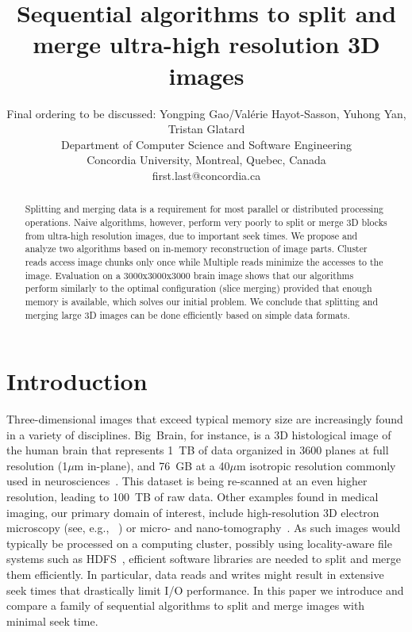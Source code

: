 \documentclass[10pt, conference, compsocconf]{IEEEtran}
\begin{document}
\title{Sequential algorithms to split and merge ultra-high resolution 3D images}

\author{Final ordering
  to be discussed: Yongping Gao/Val\'erie Hayot-Sasson,
  Yuhong Yan, Tristan Glatard\\
  Department of Computer Science and Software Engineering\\ Concordia University, Montreal, Quebec, Canada\\
  {first.last}@concordia.ca
}

\maketitle

\begin{abstract}
  Splitting and merging data is a requirement for most parallel or
  distributed processing operations. Naive algorithms, however,
  perform very poorly to split or merge 3D blocks from ultra-high
  resolution images, due to important seek times. We propose and
  analyze two algorithms based on in-memory reconstruction of image
  parts. Cluster reads access image chunks only once while Multiple
  reads minimize the accesses to the image. Evaluation on a
  3000x3000x3000 brain image shows that our algorithms perform
  similarly to the optimal configuration (slice merging) provided that
  enough memory is available, which solves our initial problem.  We
  conclude that splitting and merging large 3D images can be done
  efficiently based on simple data formats.
\end{abstract}


\section{Introduction}

Three-dimensional images that exceed typical memory size are
increasingly found in a variety of disciplines. Big~Brain, for
instance, is a 3D histological image of the human brain that
represents 1~TB of data organized in 3600 planes at full resolution
(1$\mu$m in-plane), and 76~GB at a 40$\mu$m isotropic resolution
commonly used in neurosciences~\cite{amunts2013bigbrain}. This dataset
is being re-scanned at an even higher resolution, leading to 100~TB of
raw data. Other examples found in medical imaging, our primary domain
of interest, include high-resolution 3D electron microscopy (see,
e.g., ~\cite{bock2011network}) or micro- and
nano-tomography~\cite{10.1371/journal.pone.0035691}. As such images
would typically be processed on a computing cluster, possibly using
locality-aware file systems such as HDFS~\cite{shvachko2010hadoop},
efficient software libraries are needed to split and merge them
efficiently. In particular, data reads and writes might result in
extensive seek times that drastically limit I/O performance.  In this
paper we introduce and compare a family of sequential algorithms to
split and merge images with minimal seek time.
\end{document}
